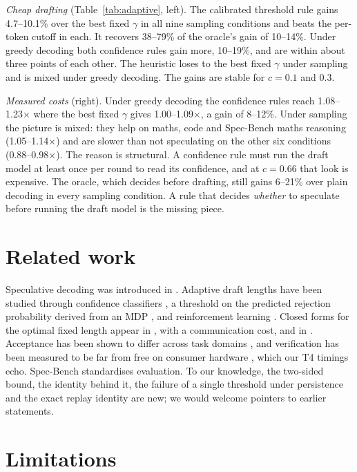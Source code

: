 \documentclass[10pt]{article}
\theoremstyle{remark}
\begin{document}
\emph{Cheap drafting} (Table~\ref{tab:adaptive}, left). The calibrated threshold rule gains 4.7--10.1\% over the best
fixed $\gamma$ in all nine sampling conditions and beats the per-token cutoff in each. It recovers 38--79\% of the
oracle's gain of 10--14\%. Under greedy decoding both confidence rules gain more, 10--19\%, and are within about
three points of each other. The heuristic loses to the best fixed $\gamma$ under sampling and is mixed under greedy
decoding. The gains are stable for $c=0.1$ and $0.3$.

\emph{Measured costs} (right). Under greedy decoding the confidence rules reach 1.08--1.23$\times$ where the best
fixed $\gamma$ gives 1.00--1.09$\times$, a gain of 8--12\%. Under sampling the picture is mixed: they help on maths,
code and Spec-Bench maths reasoning (1.05--1.14$\times$) and are slower than not speculating on the other six
conditions (0.88--0.98$\times$). The reason is structural. A confidence rule must run the draft model at least once
per round to read its confidence, and at $c=0.66$ that look is expensive. The oracle, which decides before
drafting, still gains 6--21\% over plain decoding in every sampling condition. A rule that decides
\emph{whether} to speculate before running the draft model is the missing piece.

\section{Related work}

Speculative decoding was introduced in \cite{leviathan,chen}. Adaptive draft lengths have been studied through
confidence classifiers \cite{disco}, a threshold on the predicted rejection probability derived from an MDP
\cite{specdecpp}, and reinforcement learning \cite{learningtodraft}. Closed forms for the optimal fixed length
appear in \cite{zheng}, with a communication cost, and in \cite{sdsl}. Acceptance has been shown to differ across
task domains \cite{abdellatif}, and verification has been measured to be far from free on consumer hardware
\cite{chordiya}, which our T4 timings echo. Spec-Bench \cite{specbench} standardises evaluation. To our knowledge,
the two-sided bound, the identity behind it, the failure of a single threshold under persistence and the exact
replay identity are new; we would welcome pointers to earlier statements.

\section{Limitations}
\end{document}
